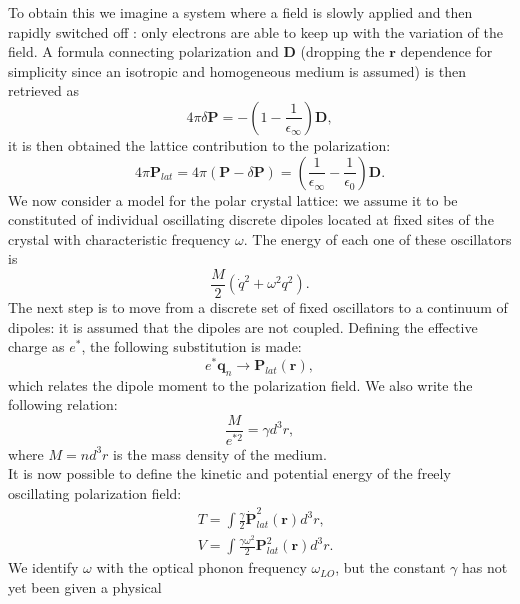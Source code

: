 To obtain this we imagine a system where a field is slowly applied and then rapidly switched off \cite{haken1976quantum}: only 
electrons are able to keep up with the variation of the field. A formula connecting polarization and $\mathbf{D}$ (dropping the $\mathbf{r}$ dependence for simplicity 
since an isotropic and homogeneous medium is assumed) is then retrieved as
\begin{equation}
    4\pi \delta \mathbf{P} = -\left(1-\frac{1}{\epsilon_\infty}\right)\mathbf{D},
\end{equation}
it is then obtained the lattice contribution to the polarization:
\begin{equation}
    4\pi \mathbf{P}_{lat} = 4\pi(\mathbf{P}-\delta \mathbf{P}) = \left(\frac{1}{\epsilon_\infty}-\frac{1}{\epsilon_0}\right)\mathbf{D}.
    \label{eq_polarization_lattice}
\end{equation}
We now consider a model for the polar crystal lattice: we assume it to be constituted of individual oscillating discrete dipoles 
located at fixed sites of the crystal with characteristic frequency $\omega$. The energy of each one of these oscillators is 
\begin{equation}
    \frac{M}{2}(\dot{q}^2+\omega^2q^2).
\end{equation}
The next step is to move from a discrete set of fixed oscillators to a continuum of dipoles: it is assumed that the dipoles are not 
coupled. Defining the effective charge as $e^*$, the following substitution is made:
\begin{equation}
    e^*\mathbf{q}_n\to \mathbf{P}_{lat}(\mathbf{r}),
\end{equation}
which relates the dipole moment to the polarization field. We also write the following relation:
\begin{equation}
    \frac{M}{e^{*2}}=\gamma d^3r,
\end{equation}
where $M=nd^3r$ is the mass density of the medium.\\
It is now possible to define the kinetic and potential energy of the freely oscillating polarization field:
\begin{equation}
\begin{split}
    &T=\int \frac{\gamma}{2}\dot{\mathbf{P}}_{lat}^2(\mathbf{r})d^3r,\\
    &V=\int \frac{\gamma\omega^2}{2}\mathbf{P}_{lat}^2(\mathbf{r})d^3r.
\end{split}
\end{equation}
We identify $\omega$ with the optical phonon frequency $\omega_{LO}$, but the constant $\gamma$ has not yet been given a physical 
